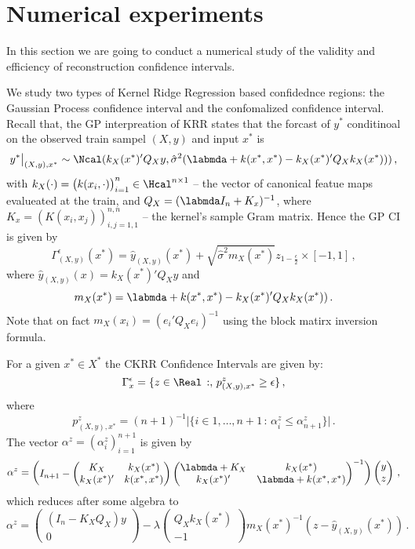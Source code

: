 \section{Numerical experiments} %
\label{sec:numerical_experiments}

In this section we are going to conduct a numerical study of the validity and
efficiency of reconstruction confidence intervals.

We study two types of Kernel Ridge Regression based confidednce regions: the Gaussian
Process confidence interval and the confomalized confidence interval. Recall that,
the GP interpreation of KRR states that the forcast of $y^*$ conditinoal on the observed
train sampel $(X, y)$ and input $x^*$ is
$$ \bigl.y^*\bigr\rvert_{(X, y), x^*}
    \sim \Ncal(k_X(x^*)' Q_X y,
        \hat{\sigma}^2(\labmda + k(x^*,x^*) - k_X(x^*)'Q_X k_X(x^*)))
    \,,$$
with $k_X(\cdot) = \bigl(k(x_i, \cdot)\bigr)_{i=1}^n\in \Hcal^{n\times 1}$ -- the vector
of canonical featue maps evalueated at the train, and $Q_X = (\labmda I_n + K_x)^{-1}$,
where $K_x = (K(x_i, x_j))_{i,j=1,1}^{n,n}$ -- the kernel's sample Gram matrix. Hence
the GP CI is given by
$$ \Gamma^\epsilon_{(X, y)}(x^*)
    = \hat{y}_{(X, y)}(x^*) + \sqrt{\hat{\sigma}^2 m_X(x^*)} z_{1-\frac{\epsilon}{2}}
        \times [-1,1]
    \,, $$
where $\hat{y}_{(X, y)}(x) = k_X(x^*)' Q_X y$ and
$$ m_X(x^*) = \labmda + k(x^*,x^*) - k_X(x^*)'Q_X k_X(x^*)) \,. $$
Note that on fact $m_X(x_i) = (e_i'Q_Xe_i)^{-1}$ using the block matirx inversion
formula.

For a given $x^*\in X^*$ the CKRR Confidence Intervals are given by:
$$ \Gamma^\epsilon_x = \{ z\in\Real\,:,\, p^z_{(X,y),x^*} \geq \epsilon \}\,, $$
where
$$ p^z_{(X,y),x^*}
    = (n+1)^{-1} \lvert\{i\in 1,\ldots, n+1 \,:\,
        \alpha_i^z \leq \alpha_{n+1}^z \}\rvert
    \,. $$
The vector $\alpha^z=(\alpha_i^z)_{i=1}^{n+1}$ is given by
$$ \alpha^z
    = \begin{pmatrix}
        I_{n+1} - \begin{pmatrix}
            K_X & k_X(x^*)\\
            k_X(x^*)' & k(x^*, x^*)
        \end{pmatrix} \begin{pmatrix}
            \labmda + K_X & k_X(x^*)\\
            k_X(x^*)' & \labmda + k(x^*, x^*)
    \end{pmatrix}^{-1} \end{pmatrix}
    \begin{pmatrix} y \\ z \end{pmatrix}
    \,, $$
which reduces after some algebra to
$$ \alpha^z
    = \begin{pmatrix} (I_n - K_X Q_X) y\\ 0 \end{pmatrix}
    - \lambda \begin{pmatrix}
            Q_X k_X(x^*)\\ -1
        \end{pmatrix}
        m_X(x^*)^{-1} (z - \hat{y}_{(X, y)}(x^*))
    \,. $$

